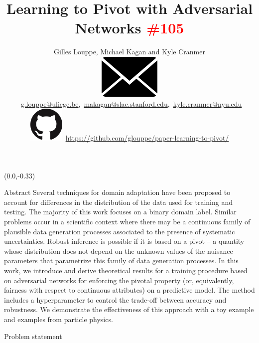 \documentclass[final,unknownkeysallowed]{beamer}
\title{\bf Learning to Pivot with Adversarial Networks \textcolor{red}{\#105}}
\author{Gilles Louppe, Michael Kagan and Kyle Cranmer\\[1.5ex]
{\tiny
\includegraphics[scale=0.3]{images/mail.png}~\url{g.louppe@uliege.be},~\url{makagan@slac.stanford.edu},~\url{kyle.cranmer@nyu.edu} \\[1.5ex]
\includegraphics[scale=0.35]{images/github.png}~\url{https://github.com/glouppe/paper-learning-to-pivot/}
}}
\date{}
\begin{document}
\begin{frame}{}



\begin{textblock}{0.32}(0.0,-0.33)


\begin{block}{Abstract \phantom{p}}
Several techniques for domain adaptation have been proposed to account for
differences in the distribution of the data used for training and testing. The
majority of this work focuses on a binary domain label. Similar problems occur
in a scientific context where there may be a continuous family of plausible data
generation processes associated to the presence of systematic uncertainties.
Robust inference is possible if it is based on a pivot -- a quantity whose
distribution does not depend on the unknown values of the nuisance parameters
that parametrize this family of data generation processes. {\color{red} In this work,  we
introduce and derive theoretical results for a training procedure based on
adversarial networks for enforcing the pivotal property (or, equivalently,
fairness with respect to continuous attributes) on a predictive model.} The
method includes a hyperparameter to control the trade-off between accuracy and
robustness. We demonstrate the effectiveness of this approach with a toy example
and examples from particle physics.
\end{block}

\vspace{0.5cm}
\begin{block}{Problem statement \phantom{p}}


\end{block}
\end{textblock}
\end{frame}
\end{document}

